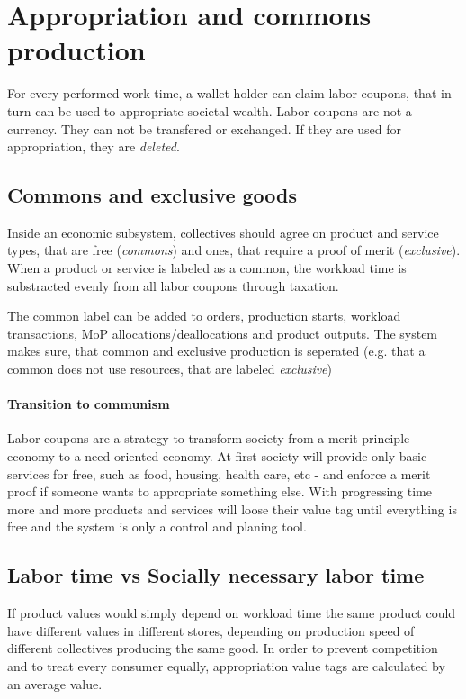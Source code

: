 \documentclass[11pt]{article}
\begin{document}
\section{Appropriation and commons production}

For every performed work time, a wallet holder can claim labor coupons, that in turn can be used to appropriate societal wealth. Labor coupons are not a currency. They can not be transfered or exchanged. If they are used for appropriation, they are \emph{deleted}. 

\subsection{Commons and exclusive goods}

Inside an economic subsystem, collectives should agree on product and service types, that are free (\emph{commons}) and ones, that require a proof of merit (\emph{exclusive}). When a product or service is labeled as a common, the workload time is substracted evenly from all labor coupons through taxation.

The common label can be added to orders, production starts, workload transactions, MoP allocations/deallocations and product outputs. The system makes sure, that common and exclusive production is seperated (e.g. that a common does not use resources, that are labeled \emph{exclusive})

\paragraph{Transition to communism} Labor coupons are a strategy to transform society from a merit principle economy to a need-oriented economy. At first society will provide only basic services for free, such as food, housing, health care, etc - and enforce a merit proof if someone wants to appropriate something else. With progressing time more and more products and services will loose their value tag until everything is free and the system is only a control and planing tool.

\subsection{Labor time vs Socially necessary labor time} 

If product values would simply depend on workload time the same product could have different values in different stores, depending on production speed of different collectives producing the same good. In order to prevent competition and to treat every consumer equally, appropriation value tags are calculated by an average value.
\end{document}
